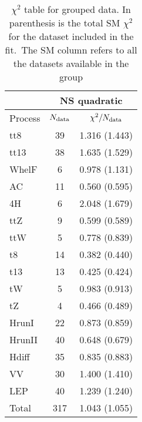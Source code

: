 \documentclass{article}
\begin{document}
\begin{table}[H]
\centering
\begin{tabular}{|l|c|c|}
\hline
& \multicolumn{2}{c|}{NS quadratic} \\ \hline
Process  & $N_{\rm data}$ & $\chi^2/N_{\rm data}$\\ \hline
tt8 & 39 & 1.316 (1.443) \\ \hline
tt13 & 38 & 1.635 (1.529) \\ \hline
WhelF & 6 & 0.978 (1.131) \\ \hline
AC & 11 & 0.560 (0.595) \\ \hline
4H & 6 & 2.048 (1.679) \\ \hline
ttZ & 9 & 0.599 (0.589) \\ \hline
ttW & 5 & 0.778 (0.839) \\ \hline
t8 & 14 & 0.382 (0.440) \\ \hline
t13 & 13 & 0.425 (0.424) \\ \hline
tW & 5 & 0.983 (0.913) \\ \hline
tZ & 4 & 0.466 (0.489) \\ \hline
HrunI & 22 & 0.873 (0.859) \\ \hline
HrunII & 40 & 0.648 (0.679) \\ \hline
Hdiff & 35 & 0.835 (0.883) \\ \hline
VV & 30 & 1.400 (1.410) \\ \hline
LEP & 40 & 1.239 (1.240) \\ \hline
 \hline Total & 317 & 1.043 (1.055) \\ \hline
\end{tabular}
\caption{$\chi^2$ table for grouped data. In parenthesis is the total SM $\chi^2$ for the dataset included in the fit.\
                    The SM column refers to all the datasets available in the group}
\end{table}
\end{document}
